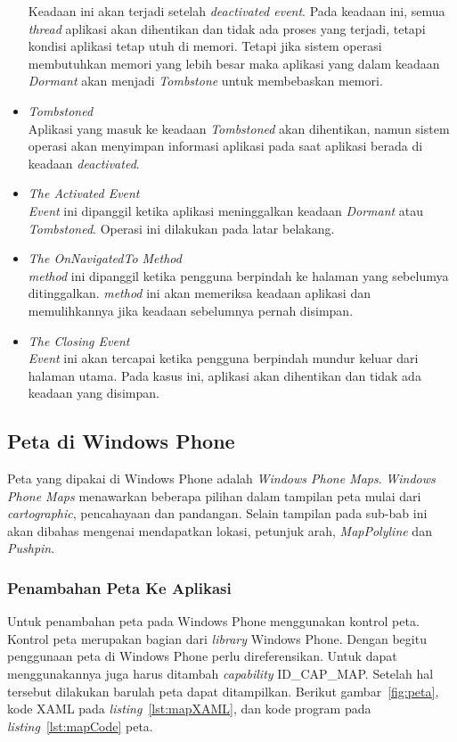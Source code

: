 \begin{itemize}
	Keadaan ini akan terjadi setelah \textit{deactivated event}. Pada keadaan ini, semua \textit{thread} aplikasi akan dihentikan dan tidak ada proses yang terjadi, tetapi kondisi aplikasi tetap utuh di memori. Tetapi jika sistem operasi membutuhkan memori yang lebih besar maka aplikasi yang dalam keadaan \textit{Dormant} akan menjadi \textit{Tombstone} untuk membebaskan memori.
	\item \textit{Tombstoned} \\
	Aplikasi yang masuk ke keadaan \textit{Tombstoned} akan dihentikan, namun sistem operasi akan menyimpan informasi aplikasi pada saat aplikasi berada di keadaan \textit{deactivated}.
	\item \textit{The Activated Event} \\
	\textit{Event} ini dipanggil ketika aplikasi meninggalkan keadaan \textit{Dormant} atau \textit{Tombstoned}. Operasi ini dilakukan pada latar belakang. 
	\item \textit{The OnNavigatedTo Method} \\
	\textit{method} ini dipanggil ketika pengguna berpindah ke halaman yang sebelumya ditinggalkan. \textit{method} ini akan memeriksa keadaan aplikasi dan memulihkannya jika keadaan sebelumnya pernah disimpan. 
	\item \textit{The Closing Event} \\
	\textit{Event} ini akan tercapai ketika pengguna berpindah mundur keluar dari halaman utama. Pada kasus ini, aplikasi akan dihentikan dan tidak ada keadaan yang disimpan. 
\end{itemize}

\subsection{Peta di Windows Phone}
\label{subsec:Peta di Windows Phone}
\hspace{0.5cm} Peta yang dipakai di Windows Phone adalah \textit{Windows Phone Maps}. \textit{Windows Phone Maps} menawarkan beberapa pilihan dalam tampilan peta mulai dari \textit{cartographic}, pencahayaan dan pandangan. Selain tampilan pada sub-bab ini akan dibahas mengenai mendapatkan lokasi, petunjuk arah, \textit{MapPolyline} dan \textit{Pushpin}\cite{MSDN}.

\subsubsection{Penambahan Peta Ke Aplikasi}
\label{subsubsec:Penambahan Peta Ke Aplikasi}
\hspace{0.5cm} Untuk penambahan peta pada Windows Phone menggunakan kontrol peta. Kontrol peta merupakan bagian dari \textit{library} Windows Phone. Dengan begitu penggunaan peta di Windows Phone perlu direferensikan. Untuk dapat menggunakannya juga harus ditambah \textit{capability} ID\_CAP\_MAP. Setelah hal tersebut dilakukan barulah peta dapat ditampilkan. Berikut gambar~\ref{fig:peta}, kode XAML pada \textit{listing}~\ref{lst:mapXAML}, dan kode program pada \textit{listing}~\ref{lst:mapCode} peta.

